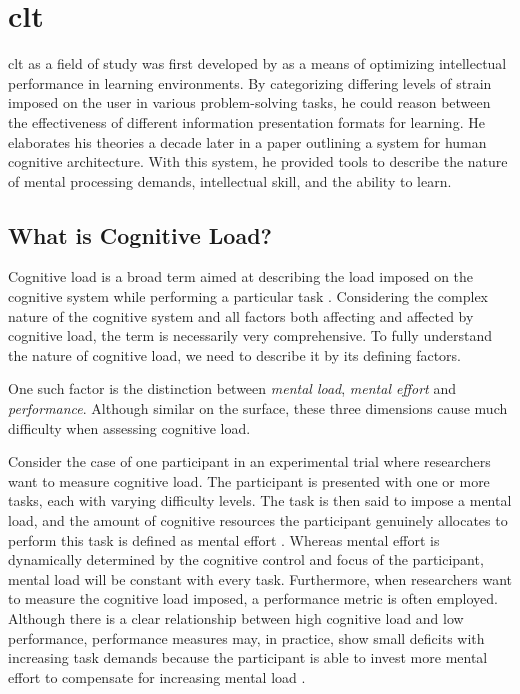 \section{\acrlong{clt}} \label{sec:bt/CLT}

\acrfull{clt} as a field of study was first developed by \textcite{sweller1988} as a means of optimizing intellectual performance in learning environments. By categorizing differing levels of strain imposed on the user in various problem-solving tasks, he could reason between the effectiveness of different information presentation formats for learning. He elaborates his theories a decade later in a paper outlining a system for human cognitive architecture. With this system, he provided tools to describe the nature of mental processing demands, intellectual skill, and the ability to learn.



\subsection{What is Cognitive Load?}


Cognitive load is a broad term aimed at describing the load imposed on the cognitive system while performing a particular task \cite{paas1994A}. Considering the complex nature of the cognitive system and all factors both affecting and affected by cognitive load, the term is necessarily very comprehensive. To fully understand the nature of cognitive load, we need to describe it by its defining factors. 

One such factor is the distinction between \textit{mental load}, \textit{mental effort} and \textit{performance}. Although similar on the surface, these three dimensions cause much difficulty when assessing cognitive load.

Consider the case of one participant in an experimental trial where researchers want to measure cognitive load. The participant is presented with one or more tasks, each with varying difficulty levels. The task is then said to impose a mental load, and the amount of cognitive resources the participant genuinely allocates to perform this task is defined as mental effort \cite{paas1994B}. Whereas mental effort is dynamically determined by the cognitive control and focus of the participant, mental load will be constant with every task. Furthermore, when researchers want to measure the cognitive load imposed, a performance metric is often employed. Although there is a clear relationship between high cognitive load and low performance, performance measures may, in practice, show small deficits with increasing task demands because the participant is able to invest more mental effort to compensate for increasing mental load \cite{tulga1980}.


